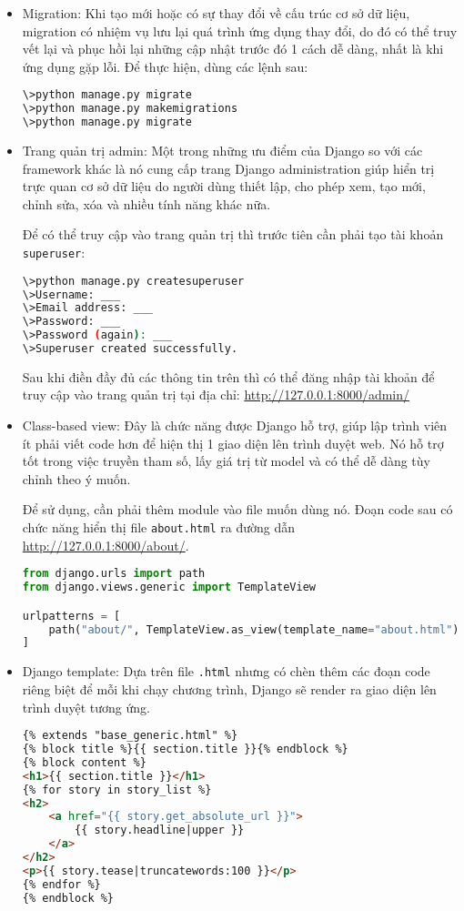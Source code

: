 \begin{itemize}
	\item Migration: Khi tạo mới hoặc có sự thay đổi về cấu trúc cơ sở dữ liệu, migration có nhiệm vụ lưu lại quá trình ứng dụng thay đổi, do đó có thể truy vết lại và phục hồi lại những cập nhật trước đó 1 cách dễ dàng, nhất là khi ứng dụng gặp lỗi. Để thực hiện, dùng các lệnh sau:
	\begin{lstlisting}[language=bash]
\>python manage.py migrate
\>python manage.py makemigrations
\>python manage.py migrate
	\end{lstlisting}
	\item Trang quản trị admin: Một trong những ưu điểm của Django so với các framework khác là nó cung cấp trang Django administration giúp hiển trị trực quan cơ sở dữ liệu do người dùng thiết lập, cho phép xem, tạo mới, chỉnh sửa, xóa và nhiều tính năng khác nữa.
	\par
	Để có thể truy cập vào trang quản trị thì trước tiên cần phải tạo tài khoản \texttt{superuser}:
	\begin{lstlisting}[language=bash]
\>python manage.py createsuperuser
\>Username: ___
\>Email address: ___
\>Password: ___
\>Password (again): ___
\>Superuser created successfully.
	\end{lstlisting}
	Sau khi điền đầy đủ các thông tin trên thì có thể đăng nhập tài khoản để truy cập vào trang quản trị tại địa chỉ: \url{http://127.0.0.1:8000/admin/}
	\item Class-based view: Đây là chức năng được Django hỗ trợ, giúp lập trình viên ít phải viết code hơn để hiện thị 1 giao diện lên trình duyệt web. Nó hỗ trợ tốt trong việc truyền tham số, lấy giá trị từ model và có thể dễ dàng tùy chỉnh theo ý muốn.
	\par
	Để sử dụng, cần phải thêm module vào file muốn dùng nó. Đoạn code sau có chức năng hiển thị file \texttt{about.html} ra đường dẫn \url{http://127.0.0.1:8000/about/}.
	\begin{lstlisting}[language=Python]
from django.urls import path
from django.views.generic import TemplateView

urlpatterns = [
	path("about/", TemplateView.as_view(template_name="about.html")),
]
	\end{lstlisting}
	\item Django template: Dựa trên file \texttt{.html} nhưng có chèn thêm các đoạn code riêng biệt để mỗi khi chạy chương trình, Django sẽ render ra giao diện lên trình duyệt tương ứng.
	\begin{lstlisting}[language=HTML]
{% extends "base_generic.html" %}
{% block title %}{{ section.title }}{% endblock %}
{% block content %}
<h1>{{ section.title }}</h1>
{% for story in story_list %}
<h2>
 	<a href="{{ story.get_absolute_url }}">
		{{ story.headline|upper }}
	</a>
</h2>
<p>{{ story.tease|truncatewords:100 }}</p>
{% endfor %}
{% endblock %}
	\end{lstlisting}
\end{itemize}
